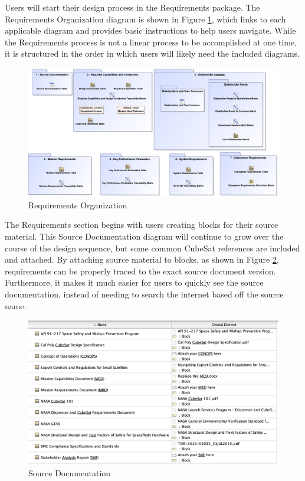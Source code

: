 
Users will start their design process in the Requirements package. The Requirements Organization diagram is shown in Figure \ref{fig:Requirements Organization}, which links to each applicable diagram and provides basic instructions to help users navigate. While the Requirements process is not a linear process to be accomplished at one time, it is structured in the order in which users will likely need the included diagrams.

\begin{figure}[H]
    \centering
    \includegraphics[scale=.5, angle=90]{Thesis/Analysis_and_Results/Analysis and Results Figures/Requirements Organization.png}
    \caption{Requirements Organization}
    \label{fig:Requirements Organization}
\end{figure}

The Requirements section begins with users creating blocks for their source material. This Source Documentation diagram will continue to grow over the course of the design sequence, but some common CubeSat references are included and attached. By attaching source material to blocks, as shown in Figure \ref{fig:Source Documentation}, requirements can be properly traced to the exact source document version. Furthermore, it makes it much easier for users to quickly see the source documentation, instead of needing to search the internet based off the source name. 

\begin{figure}[H]
    \centering
    \includegraphics[width=\textwidth]{Thesis/Analysis_and_Results/Analysis and Results Figures/Source Documentation.png}
    \caption{Source Documentation}
    \label{fig:Source Documentation}
\end{figure}

